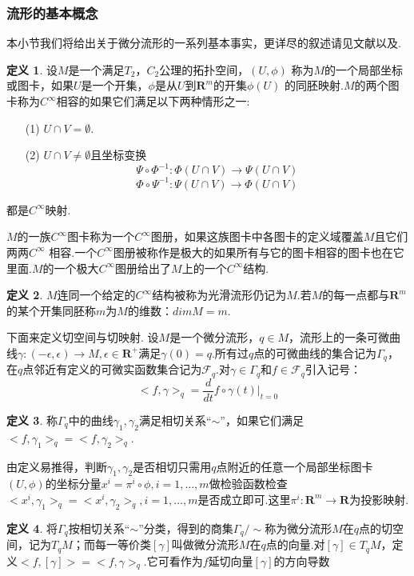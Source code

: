 \documentclass[UTF8,10.5pt,a4paper]{ctexart}
\numberwithin{equation}{section}
\theoremstyle{definition}
\theoremstyle{definition}
\newtheorem{dfn}{定义\hspace{0.05pt}}[section]
\begin{document}
\subsubsection{流形的基本概念}
本小节我们将给出关于微分流形的一系列基本事实，更详尽的叙述请见文献\cite{zzs}以及\cite{css}.
\begin{dfn}
设$M$是一个满足$T_2$，$C_2$公理的拓扑空间，$(U,\phi)$ 称为$M$的一个局部坐标或图卡，如果$U$是一个开集，$\phi$是从$U\text{到}\textbf{R}^m\text{的开集}\phi(U)$ 的同胚映射.$M$的两个图卡称为$C^\infty$相容的如果它们满足以下两种情形之一:
\begin{itemize}
     \item [(1)]$U\cap V=\emptyset\text{.}$
     \item [(2)]$U\cap V\neq\emptyset$且坐标变换$$\Psi\circ\Phi^{-1}:\Phi(U\cap V)\rightarrow\Psi(U\cap V)$$
     $$\Phi\circ\Psi^{-1}:\Psi(U\cap V)\rightarrow\Phi(U\cap V)$$
\end{itemize}
都是$C^\infty$映射.
\par $M$的一族$C^\infty$图卡称为一个$C^\infty$图册，如果这族图卡中各图卡的定义域覆盖$M$且它们两两$C^\infty$ 相容.一个$C^\infty$图册被称作是极大的如果所有与它的图卡相容的图卡也在它里面.$M$的一个极大$C^\infty$图册给出了$M$上的一个$C^\infty$结构.
\end{dfn}
\begin{dfn}
$M$连同一个给定的$C^\infty$结构被称为光滑流形仍记为$M$.若$M$的每一点都与$\textbf{R}^m$的某个开集同胚称$m$为$M$的维数：$dimM=m$.
\end{dfn}
下面来定义切空间与切映射.
设$M$是一个微分流形，$q\in M$，流形上的一条可微曲线$\gamma:(-\epsilon,\epsilon)\rightarrow M, \epsilon\in \mathbf{R}^{+}$满足$\gamma(0)=q$.所有过$q$点的可微曲线的集合记为$\Gamma_q$，在$q$点邻近有定义的可微实函数集合记为$\mathcal{F}_q$.对$\gamma\in\Gamma_q\text{和}f\in\mathcal{F}_q$引入记号：$$<f,\gamma>_q=\frac{d}{dt}f\circ\gamma(t)\big|_{t=0}$$
\begin{dfn}
称$\Gamma_q$中的曲线$\gamma_1,\gamma_2$满足相切关系“$\sim$”，如果它们满足$<f,\gamma_1>_q=<f,\gamma_2>_q$.
\end{dfn}
由定义易推得，判断$\gamma_1,\gamma_2$是否相切只需用$q$点附近的任意一个局部坐标图卡$(U,\phi)$的坐标分量$x^i=\pi^i\circ\phi,i=1,\ldots,m$做检验函数检查
$<x^i,\gamma_1>_q=<x^i,\gamma_2>_q,i=1,\ldots,m$是否成立即可.这里$\pi^i:\mathbf{R}^m\rightarrow\mathbf{R}$为投影映射.
\begin{dfn}
将$\Gamma_q$按相切关系“$\sim$”分类，得到的商集$\Gamma_q/\sim$称为微分流形$M$在$q$点的切空间，记为$T_qM$；而每一等价类$[\gamma]$叫做微分流形$M$在$q$点的向量.对$[\gamma]\in T_qM$，定义$<f,[\gamma]>=<f,\gamma>_q$.它可看作为$f$延切向量$[\gamma]$的方向导数
\end{dfn}
\end{document}
